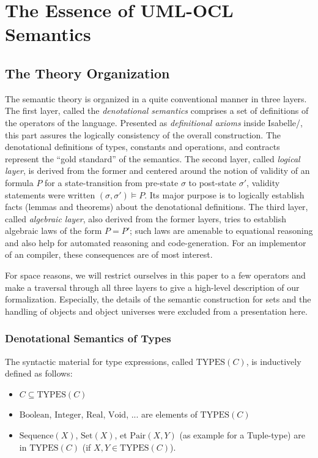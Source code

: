 \chapter{The Essence of UML-OCL Semantics}
\section{The Theory Organization}
The semantic theory is organized in a quite conventional manner in
three layers. The first layer, called the \emph{denotational
  semantics} comprises a set of definitions of the operators of the
language.  Presented as \emph{definitional axioms} inside
Isabelle/\HOL, this part assures the logically consistency of the
overall construction. The denotational definitions of types, constants
and operations, and \OCL contracts represent the ``gold standard'' of the
semantics. The second layer, called \emph{logical layer},
is derived from the former and centered around the notion of validity
of an \OCL formula $P$ for a state-transition from pre-state $\sigma$
to post-state $\sigma'$, validity statements were written $(\sigma,
\sigma') \models P$. Its major purpose is to logically establish facts
(lemmas and theorems) about the denotational definitions.
The third layer, called \emph{algebraic layer},
also derived from the former layers, tries to establish algebraic laws
of the form $P = P'$; such laws are amenable to equational reasoning
and also help for automated reasoning and code-generation. For an
implementor of an \OCL compiler, these consequences are of most interest.

For space reasons, we will restrict ourselves in this paper to a few
operators and make a traversal through all three layers to give a
high-level description of our formalization.  Especially, the details
of the semantic construction for sets and the handling of objects and
object universes were excluded from a presentation here.

\subsection{Denotational Semantics of Types}
The syntactic material for type expressions, called $\text{TYPES}(C)$, is inductively
defined as follows: 
\begin{itemize}
\item $C \subseteq \text{TYPES}(C)$ 
\item $\text{Boolean}$, $\text{Integer}$, $\text{Real}$, $\text{Void}$, ... are elements
      of $\text{TYPES}(C)$
\item $\text{Sequence}(X)$, $\text{Set}(X)$, et $\text{Pair}(X,Y)$ (as example for a Tuple-type)
      are in  $\text{TYPES}(C)$ (if $X, Y \in \text{TYPES}(C)$).
\end{itemize}

